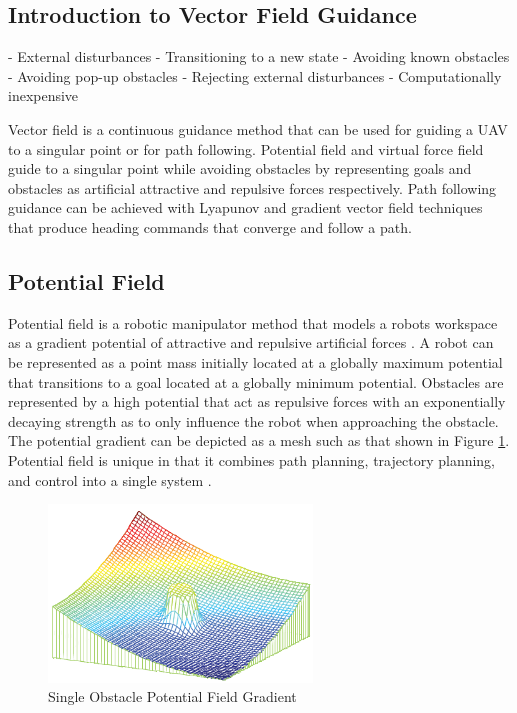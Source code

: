 \documentclass[numbered,pdftex]{ohio-etd}
\begin{document}
\subsection{Introduction to Vector Field Guidance}

- External disturbances
- Transitioning to a new state
- Avoiding known obstacles
- Avoiding pop-up obstacles
- Rejecting external disturbances
- Computationally inexpensive

Vector field is a continuous guidance method that can be used for guiding a UAV to a singular point or for path following. Potential field and virtual force field guide to a singular point while avoiding obstacles by representing goals and obstacles as artificial attractive and repulsive forces respectively. Path following guidance can be achieved with Lyapunov and gradient vector field techniques that produce heading commands that converge and follow a path. 

\subsection{Potential Field}
Potential field is a robotic manipulator method that models a robots workspace as a gradient potential of attractive and repulsive artificial forces \cite{khatib_real-time_1986}. A robot can be represented as a point mass initially located at a globally maximum potential that transitions to a goal located at a globally minimum potential. Obstacles are represented by a high potential that act as repulsive forces with an exponentially decaying strength as to only influence the robot when approaching the obstacle. The potential gradient can be depicted as a mesh such as that shown in Figure \ref{fig:pfobstacle}. Potential field is unique in that it combines path planning, trajectory planning, and control into a single system \cite{rimon_exact_1992}. 

\begin{figure}[h!]
	\centering
	\includegraphics[width=7cm]{PaperFigures/pfObstacle}
	\caption{Single Obstacle Potential Field Gradient \cite{liu_virtual-waypoint_2016}}
	\label{fig:pfobstacle}
\end{figure}
\end{document}
